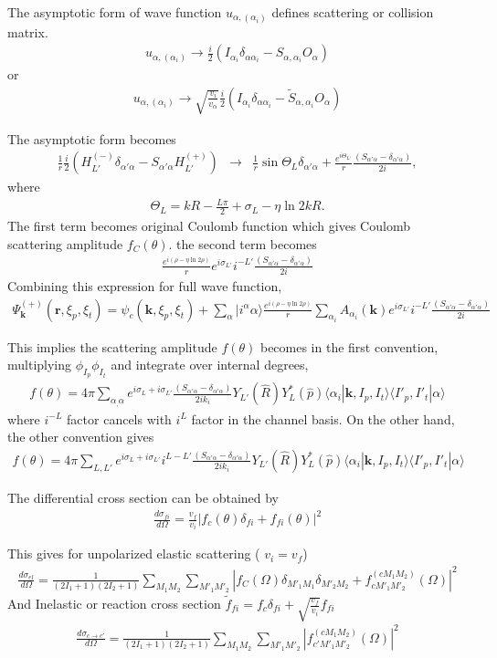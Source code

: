 \documentclass[11pt]{book}
\def\bm{\boldsymbol}
\def\vk{{\bm k}}
\def\vr{{\bm r}}
\def\la{\langle}
\def\ra{\rangle}
\newcommand{\bea}{\begin{eqnarray}}
\newcommand{\eea}{\end{eqnarray}}
\begin{document}
The asymptotic form of wave function $u_{\alpha,(\alpha_i)}$ defines scattering or collision matrix.
\bea 
u_{\alpha,(\alpha_i)} \to \frac{i}{2}(I_{\alpha_i}\delta_{\alpha\alpha_i}- S_{\alpha,\alpha_i} O_{\alpha}) 
\eea 
or 
\bea 
u_{\alpha,(\alpha_i)} \to \sqrt{\frac{v_i}{v_\alpha}}\frac{i}{2}(I_{\alpha_i}\delta_{\alpha\alpha_i}
                           - \tilde{S}_{\alpha,\alpha_i} O_{\alpha}) 
\eea 

The asymptotic form becomes
\bea 
\frac{1}{r} \frac{i}{2}\left(H_{L'}^{(-)}\delta_{\alpha'\alpha}-S_{\alpha'\alpha} H_{L'}^{(+)}\right) 
&\to & \frac{1}{r} \sin\Theta_{L}\delta_{\alpha'\alpha} 
+   \frac{e^{i\Theta_{L'}}}{r} \frac{(S_{\alpha'\alpha}-\delta_{\alpha'\alpha})}{2i},   
\eea  
where 
\bea 
\Theta_L=k R- \frac{L\pi}{2}+\sigma_{L}-\eta \ln 2 k R. 
\eea 
The first term becomes original Coulomb function which gives Coulomb scattering amplitude $f_C(\theta)$.
the second term becomes 
\bea 
\frac{e^{i(\rho-\eta \ln 2\rho)}}{r} e^{i\sigma_{L'}} i^{-L'} \frac{(S_{\alpha'\alpha}-\delta_{\alpha'\alpha})}{2i}   
\eea 
Combining this expression for full wave function,
\bea 
\Psi_\vk^{(+)}(\vr,\xi_p,\xi_t)= \psi_c(\vk,\xi_p,\xi_t) 
      +\sum_{\alpha} |i^\alpha \alpha \ra \frac{e^{i(\rho-\eta \ln 2\rho)}}{r} 
        \sum_{\alpha_i} A_{\alpha_i}(\vk)  e^{i\sigma_{L'}} i^{-L'} \frac{(S_{\alpha'\alpha}-\delta_{\alpha'\alpha})}{2i}   
\eea 


This implies the scattering amplitude $f(\theta)$ becomes in the first convention,
multiplying $\phi_{I_p} \phi_{I_t}$ and integrate over internal degrees, 
\bea 
f(\theta)=4\pi\sum_{\alpha_,\alpha} e^{i\sigma_L+i\sigma_{L'}} \frac{(S_{\alpha'\alpha}-\delta_{\alpha'\alpha})}{2ik_i} Y_{L'}(\hat{R})Y_{L}^*(\hat{p}) \la \alpha_i|\vk, I_p, I_t\ra \la I'_p,I'_t|\alpha\ra 
\eea  
where $i^{-L}$ factor cancels with $i^L$ factor in the channel basis. On the other hand, 
the other convention gives 
\bea 
f(\theta)=4\pi\sum_{L,L'} e^{i\sigma_L+i\sigma_{L'}} i^{L-L'}\frac{(S_{\alpha'\alpha}-\delta_{\alpha'\alpha})}{2ik_i} 
Y_{L'}(\hat{R}) Y_{L}^*(\hat{p}) \la \alpha_i|\vk, I_p, I_t\ra \la I'_p,I'_t|\alpha\ra 
\eea  

The differential cross section can be obtained by 
\bea 
\frac{d\sigma_{fi}}{d\Omega}= \frac{v_f}{v_i}|f_c(\theta)\delta_{fi}+f_{fi}(\theta) |^2
\eea 

This gives for unpolarized elastic scattering ( $v_i=v_f$)
\bea 
\frac{d\sigma_{el}}{d\Omega}=\frac{1}{(2I_1+1)(2I_2+1)}\sum_{M_1 M_2}\sum_{M'_1 M'_2}
      | f_C(\Omega)\delta_{M'_1 M_1}\delta_{M'_2 M_2}+ f^{(c M_1 M_2)}_{c M'_1 M'_2}(\Omega)|^2
\eea 
And Inelastic or reaction cross section $\tilde{f}_{fi}=f_c\delta_{fi}+\sqrt{\frac{v_f}{v_i}}f_{fi}$
\bea 
\frac{d\sigma_{c\to c'}}{d\Omega}=\frac{1}{(2I_1+1)(2I_2+1)}\sum_{M_1 M_2}\sum_{M'_1 M'_2}
| f^{(c M_1 M_2)}_{c' M'_1 M'_2}(\Omega)|^2
\eea 
\end{document}
